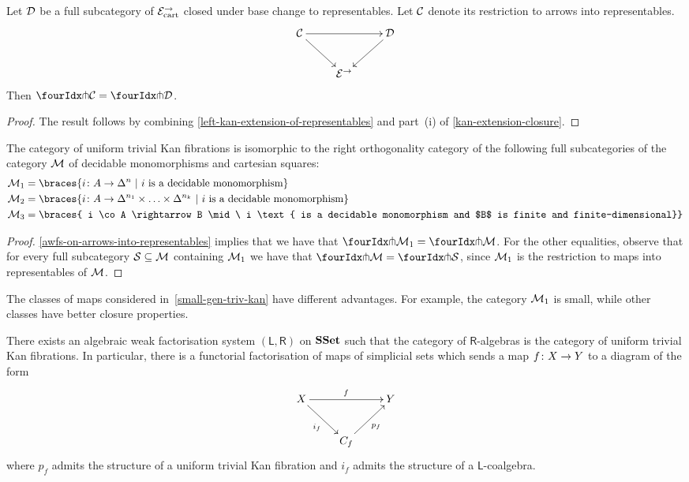 \documentclass[reqno,10pt,a4paper,oneside]{amsart}
\begin{document}
\begin{lemma}
\label{awfs-on-arrows-into-representables}
Let $\cal{D}$ be a full subcategory of $\catE_{\cart}^{\to}$ closed under base change to representables.
Let $\cal{C}$ denote its restriction to arrows into representables.
\[
\xymatrix{
  \cal{C}
  \ar[rr]
  \ar[dr]
&&
  \cal{D}
  \ar[dl]
\\&
  \catE^{\to}
}
\]
Then $\liftr{\cal{C}} = \liftr{\cal{D}}$.
\end{lemma}

\begin{proof} The result follows by combining \cref{left-kan-extension-of-representables} and part~(i) of \cref{kan-extension-closure}. 
\end{proof}


\begin{theorem} \label{small-gen-triv-kan}
The category of uniform trivial Kan fibrations is isomorphic to the right orthogonality 
category of the following full subcategories of  the category $\cal{M}$ of decidable
monomorphisms and cartesian squares:
\begin{align*}
\cal{M}_1 & = \braces{i \co A \rightarrow \Delta^{n} \ | \ i \text{ is a  decidable monomorphism} } \\ 
\cal{M}_2  & = \braces{i \co A \rightarrow \Delta^{n_1} \times \ldots \times \Delta^{n_k} 
\ | \ i \text{ is a  decidable monomorphism} }  \\
\cal{M}_3  & = \braces{ i \co A \rightarrow B \mid \ i \text{ is a decidable monomorphism and 
$B$ is finite and finite-dimensional}} 
\end{align*}
\end{theorem}

\begin{proof}    \cref{awfs-on-arrows-into-representables} implies that we have that $\liftr{\cal{M}_1}  = \liftr{\cal{M}}$.
For the other equalities, observe that for every full subcategory $\cal{S} \subseteq \cal{M}$ containing $\cal{M}_1$ we have that $\liftr{\cal{M}} = \liftr{\cal{S}}$, since $\cal{M}_1$ is the restriction to maps into representables  of $\cal{M}$. 
\end{proof}

The classes of maps considered in~\cref{small-gen-triv-kan} have different advantages. For example, 
the category $\cal{M}_1$ is small, while other classes have better closure properties. 




\begin{proposition} There exists an algebraic weak factorisation system $(\mathsf{L}, \mathsf{R})$ on
$\SSet$ such that the category of $\mathsf{R}$-algebras is the category of uniform trivial Kan fibrations. 
In particular, there is a functorial factorisation of maps of simplicial sets which sends
a map $f \co X \to Y$ to a diagram of the form
\[
\xymatrix{ 
X \ar[rr]^f \ar[dr]_{i_f}  & & Y \\
 & C_f \ar[ur]_{p_f} }
 \]
 where $p_f$ admits the structure of  a uniform trivial Kan fibration and 
 $i_f$ admits the structure of a $\mathsf{L}$-coalgebra.
\end{proposition}
\end{document}
